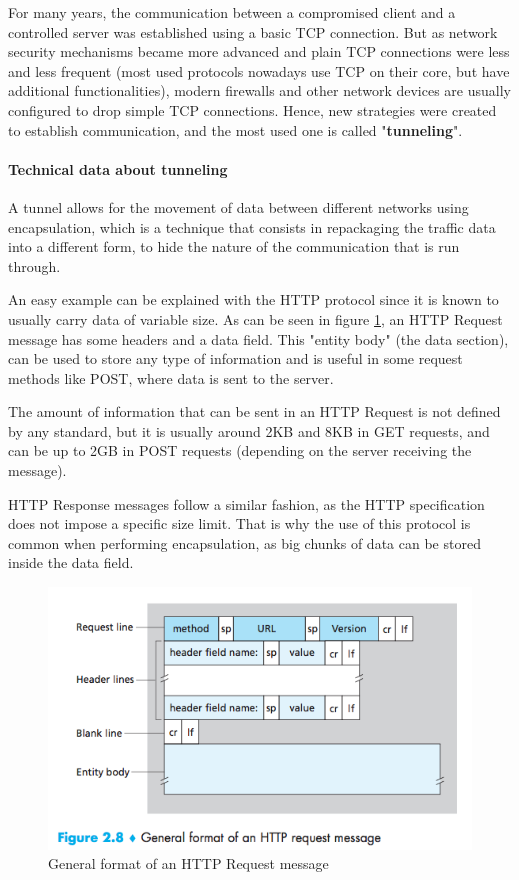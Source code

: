 For many years, the communication between a compromised client and a controlled server was established using a basic TCP connection. But as network security mechanisms became more advanced and plain TCP connections were less and less frequent (most used protocols nowadays use TCP on their core, but have additional functionalities), modern firewalls and other network devices are usually configured to drop simple TCP connections. Hence, new strategies were created to establish communication, and the most used one is called "\textbf{tunneling}".

\paragraph{Technical data about tunneling}

A tunnel allows for the movement of data between different networks using encapsulation, which is a technique that consists in repackaging the traffic data into a different form, to hide the nature of the communication that is run through.

An easy example can be explained with the HTTP protocol since it is known to usually carry data of variable size. As can be seen in figure \ref{img:httprequest}, an HTTP Request message has some headers and a data field. This "entity body" (the data section), can be used to store any type of information and is useful in some request methods like POST, where data is sent to the server.

The amount of information that can be sent in an HTTP Request is not defined by any standard, but it is usually around 2KB and 8KB in GET requests, and can be up to 2GB in POST requests (depending on the server receiving the message). 

HTTP Response messages follow a similar fashion, as the HTTP specification does not impose a specific size limit. That is why the use of this protocol is common when performing encapsulation, as big chunks of data can be stored inside the data field.

\begin{figure}[!ht]
	\centering
	\includegraphics[width=13cm,trim={0 1cm 0 0},clip]{img/http-request-message.png}
	\caption{General format of an HTTP Request message}
	\label{img:httprequest}
\end{figure}


